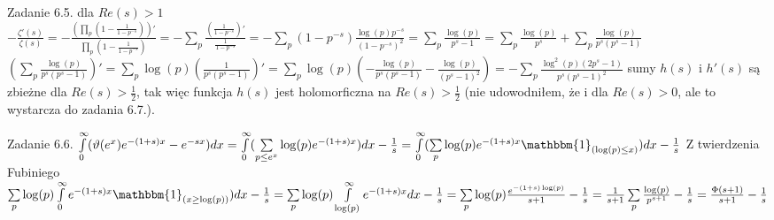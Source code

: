\documentclass{article}
\begin{document}
Zadanie 6.5.
\newline
\newline
dla $Re(s)>1$\newline
$-\frac{\zeta'(s)}{\zeta(s)}=-\frac{(\prod\limits_{p}(1-\frac{1}{1-p^{-s}}))'}{\prod\limits_{p}(1-\frac{1}{1-p^{-s}})}=
-\sum\limits_{p}\frac{(\frac{1}{1-p^{-s}})'}{\frac{1}{1-p^{-s}}}=-\sum\limits_{p}(1-p^{-s})\frac{\log(p)p^{-s}}{(1-p^{-s})^2}=
\sum\limits_{p}\frac{\log(p)}{p^s-1}=\sum\limits_{p}\frac{\log(p)}{p^s}+\sum\limits_{p}\frac{\log(p)}{p^{s}(p^{s}-1)}$\newline
$(\sum\limits_{p}\frac{\log(p)}{p^{s}(p^{s}-1)})'=\sum\limits_{p}\log(p)(\frac{1}{p^s(p^s-1)})'=\sum\limits_{p}\log(p)(-\frac{\log(p)}{p^s(p^s-1)}-\frac{\log(p)}{(p^s-1)^2})=
-\sum\limits_{p}\frac{\log^2(p)(2p^s-1)}{p^s(p^s-1)^2}$\newline
sumy $h(s)$ i $h'(s)$ są zbieżne dla $Re(s)>\frac{1}{2}$, tak więc funkcja $h(s)$ jest holomorficzna na $Re(s)>\frac{1}{2}$\newline
(nie udowodniłem, że i dla $Re(s)>0$, ale to wystarcza do zadania 6.7.).
\newline

Zadanie 6.6.
\newline
\newline
$\int\limits_{0}^{\infty}(\vartheta(e^x)e^{-(1+s)x}-e^{-sx})dx=\int\limits_{0}^{\infty}(\sum\limits_{p\le e^x}\log(p)e^{-(1+s)x})dx-\frac{1}{s}=
\int\limits_{0}^{\infty}(\sum\limits_{p}\log(p)e^{-(1+s)x}\mathbbm{1}_{(\log(p)\le x)})dx-\frac{1}{s}$\newline
Z twierdzenia Fubiniego $\sum\limits_{p}\log(p)\int\limits_{0}^{\infty}e^{-(1+s)x}\mathbbm{1}_{(x\ge\log(p))})dx-\frac{1}{s}=
\sum\limits_{p}\log(p)\int\limits_{\log(p)}^{\infty}e^{-(1+s)x}dx-\frac{1}{s}=
\sum\limits_{p}\log(p)\frac{e^{-(1+s)\log(p)}}{s+1}-\frac{1}{s}=\frac{1}{s+1}\sum\limits_{p}\frac{\log(p)}{p^{s+1}}-\frac{1}{s}=
\frac{\Phi(s+1)}{s+1}-\frac{1}{s}$
\newline
\end{document}
